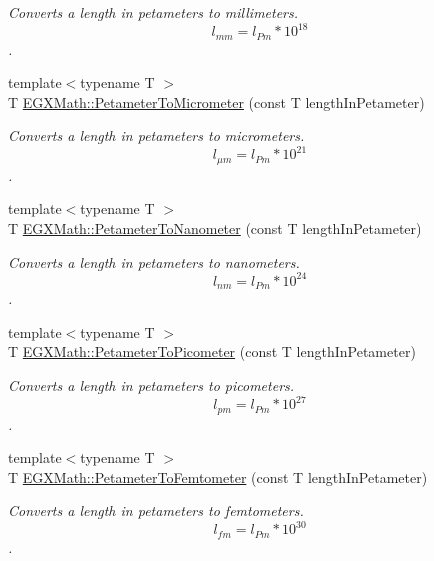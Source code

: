 \begin{DoxyCompactItemize}
\begin{DoxyCompactList}\small\item\em Converts a length in petameters to millimeters. \[ l_{mm}=l_{Pm} * 10^{18} \]. \end{DoxyCompactList}\item 
{\footnotesize template$<$typename T $>$ }\\T \mbox{\hyperlink{group___e_g_x_math-_conversions-_length_conversions-_petameter-_s_i_ga3cbe403b66dcb4d5abca922fc48a9a1c}{E\+G\+X\+Math\+::\+Petameter\+To\+Micrometer}} (const T length\+In\+Petameter)
\begin{DoxyCompactList}\small\item\em Converts a length in petameters to micrometers. \[ l_{\mu m}=l_{Pm} * 10^{21} \]. \end{DoxyCompactList}\item 
{\footnotesize template$<$typename T $>$ }\\T \mbox{\hyperlink{group___e_g_x_math-_conversions-_length_conversions-_petameter-_s_i_ga34b9bf3c48321cabdc394ab86a2e7cd7}{E\+G\+X\+Math\+::\+Petameter\+To\+Nanometer}} (const T length\+In\+Petameter)
\begin{DoxyCompactList}\small\item\em Converts a length in petameters to nanometers. \[ l_{nm}=l_{Pm} * 10^{24} \]. \end{DoxyCompactList}\item 
{\footnotesize template$<$typename T $>$ }\\T \mbox{\hyperlink{group___e_g_x_math-_conversions-_length_conversions-_petameter-_s_i_ga092df775702bdd1b027e20a243d0aa75}{E\+G\+X\+Math\+::\+Petameter\+To\+Picometer}} (const T length\+In\+Petameter)
\begin{DoxyCompactList}\small\item\em Converts a length in petameters to picometers. \[ l_{pm}=l_{Pm} * 10^{27} \]. \end{DoxyCompactList}\item 
{\footnotesize template$<$typename T $>$ }\\T \mbox{\hyperlink{group___e_g_x_math-_conversions-_length_conversions-_petameter-_s_i_ga295c384b3674727367d592d2b721fcd2}{E\+G\+X\+Math\+::\+Petameter\+To\+Femtometer}} (const T length\+In\+Petameter)
\begin{DoxyCompactList}\small\item\em Converts a length in petameters to femtometers. \[ l_{fm}=l_{Pm} * 10^{30} \]. \end{DoxyCompactList}\item 

\end{DoxyCompactItemize}
